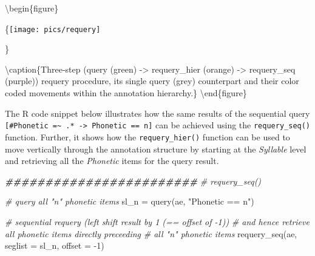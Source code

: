 \documentclass[
]{book}
\newenvironment{Shaded}{\begin{snugshade}}{\end{snugshade}}
\newcommand{\AttributeTok}[1]{\textcolor[rgb]{0.77,0.63,0.00}{#1}}
\newcommand{\CommentTok}[1]{\textcolor[rgb]{0.56,0.35,0.01}{\textit{#1}}}
\newcommand{\DecValTok}[1]{\textcolor[rgb]{0.00,0.00,0.81}{#1}}
\newcommand{\DocumentationTok}[1]{\textcolor[rgb]{0.56,0.35,0.01}{\textbf{\textit{#1}}}}
\newcommand{\FunctionTok}[1]{\textcolor[rgb]{0.00,0.00,0.00}{#1}}
\newcommand{\NormalTok}[1]{#1}
\newcommand{\OtherTok}[1]{\textcolor[rgb]{0.56,0.35,0.01}{#1}}
\newcommand{\SpecialCharTok}[1]{\textcolor[rgb]{0.00,0.00,0.00}{#1}}
\newcommand{\StringTok}[1]{\textcolor[rgb]{0.31,0.60,0.02}{#1}}
\begin{document}
\textbackslash begin\{figure\}

\{\centering \texttt{[image: pics/requery]}

\}

\textbackslash caption\{Three-step (query (green) -\textgreater{} requery\_hier (orange) -\textgreater{} requery\_seq (purple)) requery procedure, its single query (grey) counterpart and their color coded movements within the annotation hierarchy.\}\label{fig:query-requery}
\textbackslash end\{figure\}

The R code snippet below illustrates how the same results of the sequential query \texttt{{[}\#Phonetic\ =\textasciitilde{}\ .*\ -\textgreater{}\ Phonetic\ ==\ n{]}} can be achieved using the \texttt{requery\_seq()} function. Further, it shows how the \texttt{requery\_hier()} function can be used to move vertically through the annotation structure by starting at the \emph{Syllable} level and retrieving all the \emph{Phonetic} items for the query result.

\begin{Shaded}
\begin{Highlighting}[]
\DocumentationTok{\#\#\#\#\#\#\#\#\#\#\#\#\#\#\#\#\#\#\#\#\#\#\#\#}
\CommentTok{\# requery\_seq()}

\CommentTok{\# query all "n" phonetic items}
\NormalTok{sl\_n }\OtherTok{=} \FunctionTok{query}\NormalTok{(ae, }\StringTok{"Phonetic == n"}\NormalTok{)}

\CommentTok{\# sequential requery (left shift result by 1 (== offset of {-}1))}
\CommentTok{\# and hence retrieve all phonetic items directly preceeding}
\CommentTok{\# all "n" phonetic items}
\FunctionTok{requery\_seq}\NormalTok{(ae, }
            \AttributeTok{seglist =}\NormalTok{ sl\_n, }
            \AttributeTok{offset =} \SpecialCharTok{{-}}\DecValTok{1}\NormalTok{)}
\end{Highlighting}
\end{Shaded}
\end{document}
